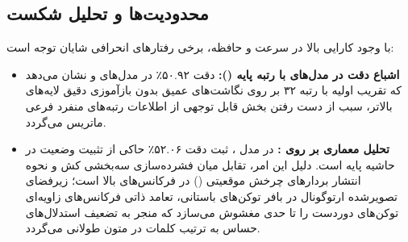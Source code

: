 \subsection{محدودیت‌ها و تحلیل شکست}
با وجود کارایی بالا در سرعت و حافظه، برخی رفتارهای انحرافی شایان توجه است:
\begin{itemize}
    \item \textbf{اشباع دقت در مدل‌های با رتبه پایه ():} دقت ۵۰.۹۲٪ در مدل‌های  و  نشان می‌دهد که تقریب اولیه با رتبه ۳۲ بر روی نگاشت‌های عمیق بدون بازآموزی دقیق لایه‌های بالاتر، سبب از دست رفتن بخش قابل توجهی از اطلاعات رتبه‌های منفرد فرعی ماتریس می‌گردد.
    \item \textbf{تحلیل معماری بر روی :} در مدل ، ثبت دقت ۵۲.۰۶٪ حاکی از تثبیت وضعیت در حاشیه پایه است. دلیل این امر، تقابل میان فشرده‌سازی سه‌بخشی کش و نحوه انتشار بردارهای چرخش موقعیتی () در فرکانس‌های بالا است؛ زیرفضای تصویرشده ارتوگونال در بافر توکن‌های باستانی، تعامد ذاتی فرکانس‌های زاویه‌ای توکن‌های دوردست را تا حدی مغشوش می‌سازد که منجر به تضعیف استدلال‌های حساس به ترتیب کلمات در متون طولانی می‌گردد.
\end{itemize}
